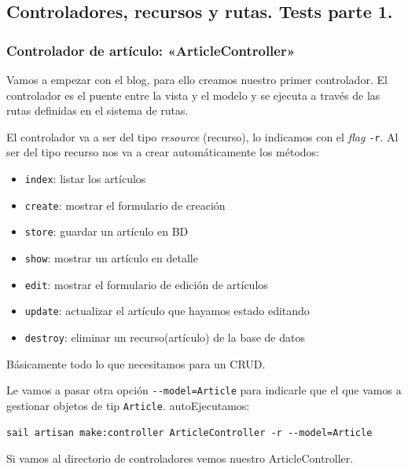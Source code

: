 \documentclass[11pt]{article}
\begin{document}
\subsection{Controladores, recursos y rutas. Tests parte 1.}
\label{sec:org45f1230}
\subsubsection{Controlador de artículo: «ArticleController»}
\label{sec:org12442dc}
Vamos a empezar con el blog, para ello creamos nuestro primer
controlador. El controlador es el puente entre la vista y el modelo y
se ejecuta a través de las rutas definidas en el sistema de rutas.

El controlador va a ser del tipo \emph{resource} (recurso), lo indicamos
con el \emph{flag} \texttt{-r}. Al ser del tipo recurso nos va a crear
automáticamente los métodos:
\begin{itemize}
\item \texttt{index}: listar los artículos
\item \texttt{create}: mostrar el formulario de creación
\item \texttt{store}: guardar un artículo en BD
\item \texttt{show}: mostrar un artículo en detalle
\item \texttt{edit}: mostrar el formulario de edición de artículos
\item \texttt{update}: actualizar el artículo que hayamos estado editando
\item \texttt{destroy}: eliminar un recurso(artículo) de la base de datos
\end{itemize}

Básicamente todo lo que necesitamos para un CRUD.

Le vamos a pasar otra opción \texttt{-{}-{}model=Article} para indicarle que el
que vamos a gestionar objetos de tip \texttt{Article}.
autoEjecutamos:
\begin{verbatim}
sail artisan make:controller ArticleController -r --model=Article
\end{verbatim}

Si vamos al directorio de controladores vemos nuestro
ArticleController.
\end{document}
